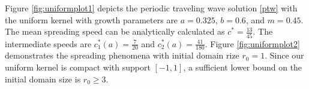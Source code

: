 \documentclass[11pt]{article}
\theoremstyle{definition}
\numberwithin{equation}{section}
\numberwithin{thm}{section}
\renewcommand{\a}{a}
\renewcommand{\b}{b}
\newcommand{\m}{m}
\begin{document}
Figure \ref{fig:uniformplot1} depicts the periodic traveling wave solution \ref{ptw} with the uniform kernel with growth parameters are $\a=0.325$, $\b=0.6$, and $\m=0.45$. The mean spreading speed can be analytically calculated as $c^*=\frac{13}{45}$. The intermediate speeds are $c_1^*(\a)=\frac{7}{20}$ and $c_2^*(\a)=\frac{41}{180}$. Figure \ref{fig:uniformplot2} demonstrates the spreading phenomena with initial domain rize $r_0=1$. Since our uniform kernel is compact with support $[-1,1]$, a sufficient lower bound on the initial domain size is $r_0 \geq 3$.


\begin{figure}
\centering
\begin{minipage}{.5\textwidth}
  \centering
\end{minipage}%
\begin{minipage}{.5\textwidth}
  \centering

\end{minipage}
\end{figure}
\end{document}
